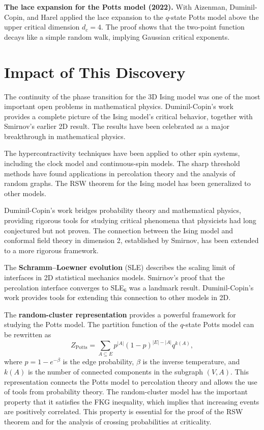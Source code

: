 \textbf{The lace expansion for the Potts model (2022).} With Aizenman, Duminil-Copin, and Harel applied the lace expansion to the $q$-state Potts model above the upper critical dimension $d_c = 4$. The proof shows that the two-point function decays like a simple random walk, implying Gaussian critical exponents.

\section{Impact of This Discovery}

The continuity of the phase transition for the 3D Ising model was one of the most important open problems in mathematical physics. Duminil-Copin's work provides a complete picture of the Ising model's critical behavior, together with Smirnov's earlier 2D result. The results have been celebrated as a major breakthrough in mathematical physics.

The hypercontractivity techniques have been applied to other spin systems, including the clock model and continuous-spin models. The sharp threshold methods have found applications in percolation theory and the analysis of random graphs. The RSW theorem for the Ising model has been generalized to other models.

Duminil-Copin's work bridges probability theory and mathematical physics, providing rigorous tools for studying critical phenomena that physicists had long conjectured but not proven. The connection between the Ising model and conformal field theory in dimension 2, established by Smirnov, has been extended to a more rigorous framework.

The \textbf{Schramm--Loewner evolution} (SLE) describes the scaling limit of interfaces in 2D statistical mechanics models. Smirnov's proof that the percolation interface converges to SLE$_6$ was a landmark result. Duminil-Copin's work provides tools for extending this connection to other models in 2D.

The \textbf{random-cluster representation} provides a powerful framework for studying the Potts model. The partition function of the $q$-state Potts model can be rewritten as
\[
Z_{\text{Potts}} = \sum_{A \subseteq E} p^{|A|}(1-p)^{|E|-|A|} q^{k(A)},
\]
where $p = 1 - e^{-\beta}$ is the edge probability, $\beta$ is the inverse temperature, and $k(A)$ is the number of connected components in the subgraph $(V, A)$. This representation connects the Potts model to percolation theory and allows the use of tools from probability theory. The random-cluster model has the important property that it satisfies the FKG inequality, which implies that increasing events are positively correlated. This property is essential for the proof of the RSW theorem and for the analysis of crossing probabilities at criticality.

